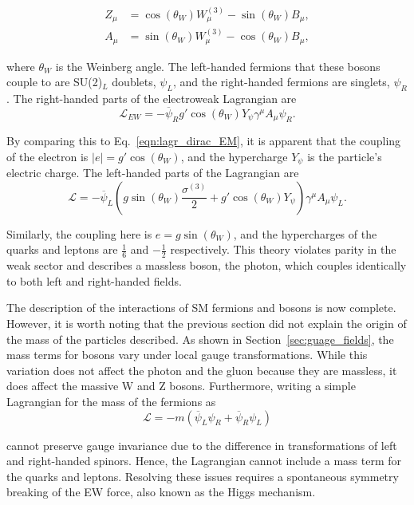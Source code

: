 \begin{align}
    Z_\mu &= \cos(\theta_W) W_{\mu}^{(3)} - \sin(\theta_W) B_\mu, \label{eqn:ew_rotation_z}\\
    A_\mu &= \sin(\theta_W) W_{\mu}^{(3)} - \cos(\theta_W) B_\mu, 
    \label{eqn:ew_rotation_a}
\end{align}

\noindent where $\theta_W$ is the Weinberg angle. The left-handed fermions that these bosons couple to are SU(2)$_L$ doublets, $\psi_L$, and the right-handed fermions are singlets, $\psi_R$. The right-handed parts of the electroweak Lagrangian are
\begin{equation}
    \mathcal{L}_{EW} = -\overline{\psi}_R g' \cos(\theta_W) Y_\psi \gamma^\mu A_\mu \psi_R.
\end{equation}

By comparing this to Eq.~\ref{eqn:lagr_dirac_EM}, it is apparent that the coupling of the electron is $|e| = g' \cos(\theta_W)$, and the hypercharge $Y_\psi$ is the particle's electric charge. The left-handed parts of the Lagrangian are
\begin{equation}
    \mathcal{L} = -\overline{\psi}_L (g \sin(\theta_W) \frac{\sigma^{(3)}}{2} + g' \cos(\theta_W) Y_\psi) \gamma^\mu A_\mu \psi_L.
\end{equation}

Similarly, the coupling here is $e = g \sin(\theta_W)$, and the hypercharges of the quarks and leptons are $\frac{1}{6}$ and $-\frac{1}{2}$ respectively. This theory violates parity in the weak sector and describes a massless boson, the photon, which couples identically to both left and right-handed fields.


The description of the interactions of SM fermions and bosons is now complete. However, it is worth noting that the previous section did not explain the origin of the mass of the particles described. As shown in Section~\ref{sec:guage_fields}, the mass terms for bosons vary under local gauge transformations. While this variation does not affect the photon and the gluon because they are massless, it does affect the massive W and Z bosons. Furthermore, writing a simple Lagrangian for the mass of the fermions as 
\begin{equation}
    \mathcal{L} = -m (\overline{\psi}_L \psi_R + \overline{\psi}_R \psi_L)
\end{equation}

\noindent cannot preserve gauge invariance due to the difference in transformations of left and right-handed spinors. Hence, the Lagrangian cannot include a mass term for the quarks and leptons. Resolving these issues requires a spontaneous symmetry breaking of the EW force, also known as the Higgs mechanism.

